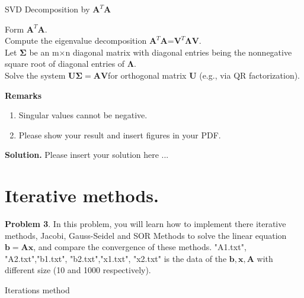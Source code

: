 \documentclass[english,onecolumn]{IEEEtran}
\begin{document}
\begin{algorithm}[htbp]
\caption{SVD Decomposition by $\mathbf{A}^T\mathbf{A}$}
\label{alg:svd}
\SetAlgoLined
{}
Form $\mathbf{A}^T\mathbf{A}$.\\
Compute the eigenvalue decomposition $\mathbf{A}^T\mathbf{A}$=$\mathbf{V}^T\mathbf{\Lambda V}$.\\
Let $\mathbf{\Sigma}$ be an m$\times$n diagonal matrix with diagonal entries being the nonnegative square root of diagonal entries of $\mathbf{\Lambda}$.\\
Solve the system $\mathbf{U\Sigma} = \mathbf{AV} $for orthogonal matrix $\mathbf{U}$ (e.g., via QR factorization). \\

\end{algorithm}
{\bf Remarks}
\begin{enumerate}
    \item Singular values cannot be negative.
    \item Please show your result and insert figures in your PDF.
\end{enumerate}

\noindent
\textbf{Solution.}
Please insert your solution here ...

\clearpage
\newpage
\section{Iterative methods.}
\noindent\textbf{Problem 3}.
In this problem, you will learn how to implement there iterative methods, Jacobi, Gauss-Seidel and SOR Methods to solve the linear equation $\mathbf{b}=\mathbf{Ax}$, and compare the convergence of these methods. 
"A1.txt", "A2.txt","b1.txt", "b2.txt","x1.txt", "x2.txt" is the data of the $\mathbf{b}, \mathbf{x}, \mathbf{A}$ with different size (10 and 1000 respectively).
\begin{algorithm}
	\caption{Iterations method}
	\label{algo:Jacobi}
    \LinesNumbered
\end{algorithm}
\end{document}
